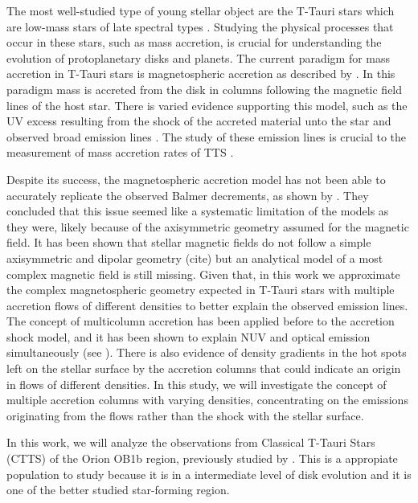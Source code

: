 \documentclass[twocolumn,linenumbers]{aastex631}
\begin{document}
The most well-studied type of young stellar object are the T-Tauri stars which  are low-mass stars of late spectral types \citep{hartmann2016}. Studying the physical processes that occur in these stars, such as mass accretion, is crucial for understanding the evolution of protoplanetary disks and planets. The current paradigm for mass accretion in T-Tauri stars is magnetospheric accretion as described by \citet{hartmann2016}. In this paradigm mass is accreted from the disk in columns following the magnetic field lines of the host star. There is varied evidence supporting this model, such as the UV excess resulting from the shock of the accreted material unto the star \citep{calvet_gullbring1998}  and observed broad emission lines \citep{muzerolle2001}. The study of these emission lines is crucial to the measurement of mass accretion rates of TTS \citep{hartmann1994, muzerolle1998a, muzerolle1998b, muzerolle2001}.


Despite its success, the magnetospheric accretion model has not been able to accurately replicate the observed Balmer decrements, as shown by \citet{micolta2023}. They concluded that this issue seemed like a systematic limitation of the models as they were, likely because of the axisymmetric geometry assumed for the magnetic field. It has been shown that stellar magnetic fields do not follow a simple axisymmetric and dipolar geometry (cite) but an analytical model of a most complex magnetic field is still missing. Given that, in this work we approximate the complex magnetospheric geometry expected in T-Tauri stars with multiple accretion flows of different densities to better explain the observed emission lines. The concept of multicolumn accretion has been applied before to the accretion shock model, and it has been shown to explain NUV and optical emission simultaneously (see \citet{ingleby2013, pittman2022}). There is also evidence of density gradients in the hot spots left on the stellar surface by the accretion columns \citep{espaillat2021} that could indicate an origin in flows of different densities. In this study, we will investigate the concept of multiple accretion columns with varying densities, concentrating on the emissions originating from the flows rather than the shock with the stellar surface.

In this work, we will analyze the observations from  Classical T-Tauri Stars (CTTS) of the Orion OB1b region, previously studied by \citet{manara2021}. This is a appropiate population to study because it is in a intermediate level of disk evolution and it is one of the better studied star-forming region.
\end{document}
